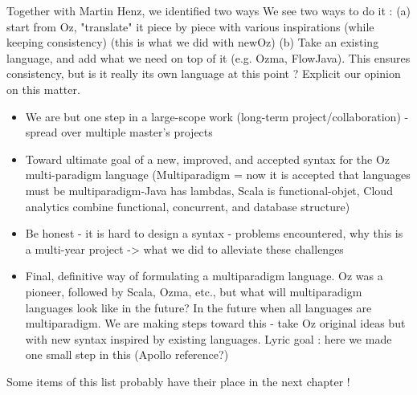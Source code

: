 Together with Martin Henz, we identified two ways
We see two ways to do it :  (a) start from Oz, "translate" it piece by piece with various inspirations (while keeping consistency) (this is what we did with newOz) (b) Take an existing language, and add what we need on top of it (e.g. Ozma, FlowJava). This ensures consistency, but is it really its own language at this point ?
Explicit our opinion on this matter.

\begin{itemize}
\item We are but one step in a large-scope work (long-term project/collaboration) - spread over multiple master's projects
\item Toward ultimate goal of a new, improved, and accepted syntax for the Oz multi-paradigm language (Multiparadigm = now it is accepted that languages must be multiparadigm-Java has lambdas, Scala is functional-objet, Cloud analytics combine functional, concurrent, and database structure)
\item Be honest - it is hard to design a syntax - problems encountered, why this is a multi-year project -> what we did to alleviate these challenges
\item Final, definitive way of formulating a multiparadigm language.  Oz was a pioneer, followed by Scala, Ozma, etc., but what will multiparadigm languages look like in the future?  In the future when all languages are multiparadigm. We are making steps toward this - take Oz original ideas but with new syntax inspired by existing languages. Lyric goal : here we made one small step in this (Apollo reference?)
\end{itemize}
Some items of this list probably have their place in the next chapter !